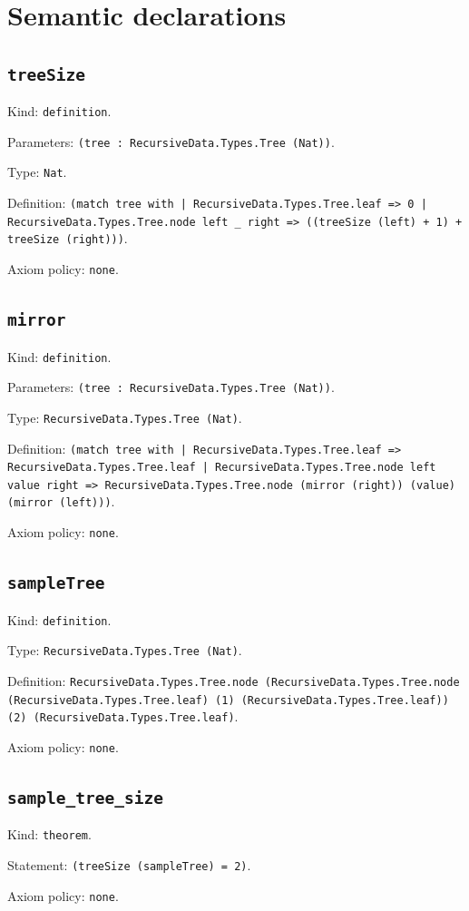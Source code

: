 \documentclass[11pt]{article}
\begin{document}
\section*{Semantic declarations}
\subsection*{\texttt{treeSize}}
\noindent Kind: \texttt{definition}.\par
\noindent Parameters: \texttt{(tree : RecursiveData.Types.Tree (Nat))}.\par
\noindent Type: \texttt{Nat}.\par
\noindent Definition: \texttt{(match tree with | RecursiveData.Types.Tree.leaf => 0 | RecursiveData.Types.Tree.node left \_ right => ((treeSize (left) + 1) + treeSize (right)))}.\par
\noindent Axiom policy: \texttt{none}.\par
\subsection*{\texttt{mirror}}
\noindent Kind: \texttt{definition}.\par
\noindent Parameters: \texttt{(tree : RecursiveData.Types.Tree (Nat))}.\par
\noindent Type: \texttt{RecursiveData.Types.Tree (Nat)}.\par
\noindent Definition: \texttt{(match tree with | RecursiveData.Types.Tree.leaf => RecursiveData.Types.Tree.leaf | RecursiveData.Types.Tree.node left value right => RecursiveData.Types.Tree.node (mirror (right)) (value) (mirror (left)))}.\par
\noindent Axiom policy: \texttt{none}.\par
\subsection*{\texttt{sampleTree}}
\noindent Kind: \texttt{definition}.\par
\noindent Type: \texttt{RecursiveData.Types.Tree (Nat)}.\par
\noindent Definition: \texttt{RecursiveData.Types.Tree.node (RecursiveData.Types.Tree.node (RecursiveData.Types.Tree.leaf) (1) (RecursiveData.Types.Tree.leaf)) (2) (RecursiveData.Types.Tree.leaf)}.\par
\noindent Axiom policy: \texttt{none}.\par
\subsection*{\texttt{sample\_tree\_size}}
\noindent Kind: \texttt{theorem}.\par
\noindent Statement: \texttt{(treeSize (sampleTree) = 2)}.\par
\noindent Axiom policy: \texttt{none}.\par
\end{document}
